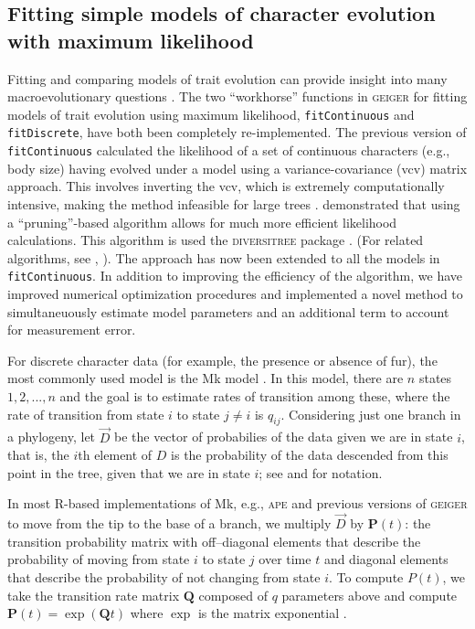 \subsection{Fitting simple models of character evolution with maximum likelihood}

Fitting and comparing  models of trait evolution can provide insight into many macroevolutionary questions \citep{PennellHarmon}. The two ``workhorse'' functions in \textsc{geiger} for fitting models of trait evolution using maximum likelihood, \texttt{fitContinuous} and \texttt{fitDiscrete}, have both been completely re-implemented. The previous version of \texttt{fitContinuous} calculated the likelihood of a set of continuous characters (e.g., body size) having evolved under a model using a variance-covariance (vcv) matrix approach. This involves inverting the vcv, which is extremely computationally intensive, making the method infeasible for large trees \citep{Hadfield2010, FitzJohn2012, Freckleton2012, Ho2014}. \citet{FitzJohn2012} demonstrated that using a ``pruning''-based algorithm \citep{Felsenstein1973} allows for much more efficient likelihood calculations. This algorithm is used the \textsc{diversitree} package \citep{FitzJohn2012}. (For related algorithms, see \citealt{Freckleton2012}, \citealt{Ho2014}). The approach has now been extended to all the models in \texttt{fitContinuous}. In addition to improving the efficiency of the algorithm, we have improved numerical optimization procedures and implemented a novel method to simultaneuously estimate model parameters and an additional term to account for measurement error.

For discrete character data (for example, the presence or absence of fur), the most commonly used model is the Mk model \citep{Pagel1994, Lewis2001}.  In this model, there are $n$ states $1, 2, ..., n$ and the goal is to estimate rates of
transition among these, where the rate of transition from state $i$ to
state $j \neq i$ is $q_{ij}$.  Considering just one branch in a
phylogeny, let $\vec D$ be the vector of probabilies of the data given
we are in state $i$, that is, the $i$th element of $D$ is the
probability of the data descended from this point in the tree, given
that we are in state $i$; see \citet{Maddison2007} and \citet{FitzJohn2012}
for notation.

In most R-based implementations of Mk, e.g., \textsc{ape} \citep{ape}
and previous versions of \textsc{geiger} \citep{Harmon2008} to move from the
tip to the base of a branch, we multiply $\vec D$ by $\mathbf{P}(t)$: the
transition probability matrix with off--diagonal elements that describe
the probability of moving from state $i$ to state $j$ over time $t$
and diagonal elements that describe the probability of not changing
from state $i$.  To compute $P(t)$, we take the transition rate matrix
$\mathbf{Q}$ composed of $q$ parameters above and compute
$\mathbf{P}(t) = \exp(\mathbf{Q} t)$ where $\exp$ is the matrix
exponential \citep{Sidje-1998-130}.

